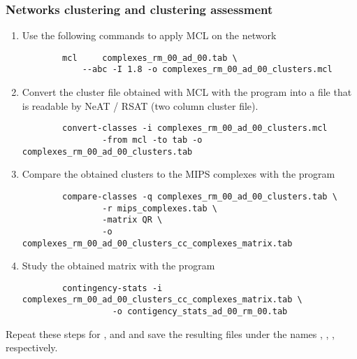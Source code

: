 \subsubsection{Networks clustering and clustering assessment}
\begin{enumerate}
  \item Use the following commands to apply MCL on the network
  {\color{Blue} \begin{footnotesize} 
		\begin{verbatim}
  		mcl 	complexes_rm_00_ad_00.tab \
  			--abc -I 1.8 -o complexes_rm_00_ad_00_clusters.mcl
  \end{verbatim} \end{footnotesize}}
  \item Convert the cluster file obtained with MCL with the program  into a file that is readable by NeAT / RSAT (two column cluster file).
    {\color{Blue} \begin{footnotesize} 
		\begin{verbatim}
  		convert-classes	-i complexes_rm_00_ad_00_clusters.mcl 
  				-from mcl -to tab -o complexes_rm_00_ad_00_clusters.tab 
  \end{verbatim} \end{footnotesize}}
  \item Compare the obtained clusters to the MIPS complexes with the program 
    {\color{Blue} \begin{footnotesize} 
		\begin{verbatim}
  		compare-classes	-q complexes_rm_00_ad_00_clusters.tab \
  				-r mips_complexes.tab \
  				-matrix QR \
  				-o complexes_rm_00_ad_00_clusters_cc_complexes_matrix.tab 
  \end{verbatim} \end{footnotesize} } 
  \item Study the obtained matrix with the  program
    {\color{Blue} \begin{footnotesize} 
		\begin{verbatim}
		contingency-stats -i complexes_rm_00_ad_00_clusters_cc_complexes_matrix.tab \
				  -o contigency_stats_ad_00_rm_00.tab
  \end{verbatim} \end{footnotesize}  }  
\end{enumerate}

Repeat these steps for \file{complexes\_rm\_10\_ad\_10.tab},  and  and save the resulting files under the names , , , respectively.



